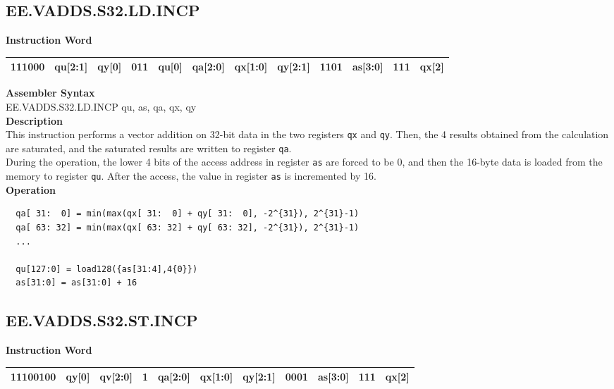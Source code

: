 \clearpage
\subsection{EE.VADDS.S32.LD.INCP}\label{instruction:EEVADDSS32LDINCP}
\setlength\tabcolsep{6pt}
\textbf{Instruction Word} \\
\begin{tabular}{|c|c|c|c|c|c|c|c|c|c|c|c|}
	\hline
	111000 & qu[2:1] & qy[0] & 011 & qu[0] & qa[2:0] & qx[1:0] & qy[2:1] & 1101 & as[3:0] & 111 & qx[2] \\
	\hline
\end{tabular}

\textbf{Assembler Syntax} \\
EE.VADDS.S32.LD.INCP qu, as, qa, qx, qy \\
\textbf{Description} \\
This instruction performs a vector addition on 32-bit data in the two registers \lstinline{qx} and \lstinline{qy}. Then, the 4 results obtained from the calculation are saturated, and the saturated results are written to register \lstinline{qa}. \\ During the operation, the lower 4 bits of the access address in register \lstinline{as} are forced to be 0, and then the 16-byte data is loaded from the memory to register \lstinline{qu}. After the access, the value in register \lstinline{as} is incremented by 16.\\
\textbf{Operation}
\begin{lstlisting}
  qa[ 31:  0] = min(max(qx[ 31:  0] + qy[ 31:  0], -2^{31}), 2^{31}-1)
  qa[ 63: 32] = min(max(qx[ 63: 32] + qy[ 63: 32], -2^{31}), 2^{31}-1)
  ...

  qu[127:0] = load128({as[31:4],4{0}})
  as[31:0] = as[31:0] + 16
\end{lstlisting}

\clearpage
\subsection{EE.VADDS.S32.ST.INCP}\label{instruction:EEVADDSS32STINCP}
\setlength\tabcolsep{6pt}
\textbf{Instruction Word} \\
\begin{tabular}{|c|c|c|c|c|c|c|c|c|c|c|}
	\hline
	11100100 & qy[0] & qv[2:0] & 1 & qa[2:0] & qx[1:0] & qy[2:1] & 0001 & as[3:0] & 111 & qx[2] \\
	\hline
\end{tabular}

